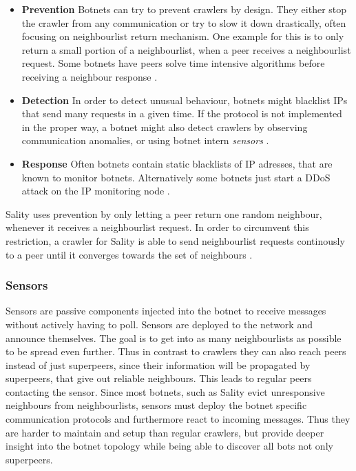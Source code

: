 \documentclass{article}
\begin{document}
\begin{itemize}
    \item \textbf{Prevention}  Botnets can try to prevent crawlers by design. They either stop the crawler from any communication or try to slow it down drastically, often focusing on neighbourlist return mechanism. One example for this is to only return a small portion of a neighbourlist, when a peer receives a neighbourlist request. Some botnets have peers solve time intensive algorithms before receiving a neighbour response \cite{AMP2P}.
    \item \textbf{Detection}  In order to detect unusual behaviour, botnets might blacklist IPs that send many requests in a given time. If the protocol is not implemented in the proper way, a botnet might also detect crawlers by observing communication anomalies, or using botnet intern \emph{sensors} \cite{andriesse2015reliable}.
    \item \textbf{Response}  Often botnets contain static blacklists of IP adresses, that are known to monitor botnets. Alternatively some botnets just start a DDoS attack on the IP monitoring node \cite{AMP2P}.
\end{itemize}

Sality uses prevention by only letting a peer return one random neighbour, whenever it receives a neighbourlist request. In order to circumvent this restriction, a crawler for Sality is able to send neighbourlist requests continously to a peer until it converges towards the set of neighbours \cite{AMP2P}. 

\subsubsection{Sensors} \label{sec:Sensors}
Sensors are passive components injected into the botnet to receive messages without actively having to poll. Sensors are deployed to the network and announce themselves. The goal is to get into as many neighbourlists as possible to be spread even further. Thus in contrast to crawlers they can also reach peers instead of just superpeers, since their information will be propagated by superpeers, that give out reliable neighbours. This leads to regular peers contacting the sensor. Since most botnets, such as Sality evict unresponsive neighbours from neighbourlists, sensors must deploy the botnet specific communication protocols and furthermore react to incoming messages. Thus they are harder to maintain and setup than regular crawlers, but provide deeper insight into the botnet topology while being able to discover all bots not only superpeers. 
\end{document}
